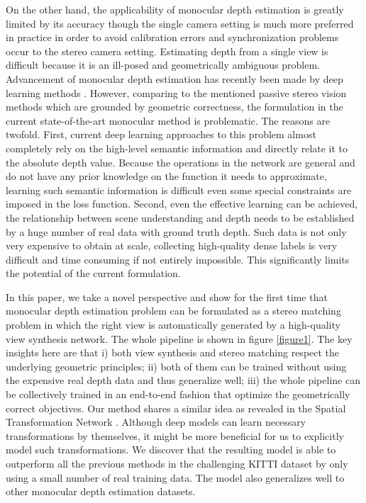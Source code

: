 \documentclass[10pt,twocolumn,letterpaper]{article}
\begin{document}
On the other hand, the applicability of monocular depth estimation is greatly limited by its accuracy though the single camera setting is much more preferred in practice in order to avoid calibration errors and synchronization problems occur to the stereo camera setting. Estimating depth from a single view is difficult because it is an ill-posed and geometrically ambiguous problem. Advancement of monocular depth estimation has recently been made by deep learning methods \cite{eigen2014depth,laina2016deeper,li2015depth,liu2015deep}
. However, comparing to the mentioned passive stereo vision methods which are grounded by geometric correctness, the formulation in the current state-of-the-art monocular method is problematic. The reasons are twofold. First, current deep learning approaches to this problem almost completely rely on the high-level semantic information and directly relate it to the absolute depth value. Because the operations in the network are general and do not have any prior knowledge on the function it needs to approximate, learning such semantic information is difficult even some special constraints are imposed in the loss function. Second, even the effective learning can be achieved, the relationship between scene understanding and depth needs to be established by a huge number of real data with ground truth depth. Such data is not only very expensive to obtain at scale, collecting high-quality dense labels is very difficult and time consuming if not entirely impossible. This significantly limits the potential of the current formulation.

In this paper, we take a novel perspective and show for the first time that monocular depth estimation problem can be formulated as a stereo matching problem in which the right view is automatically generated by a high-quality view synthesis network. The whole pipeline is shown in figure \ref{figure1}. The key insights here are that i) both view synthesis and stereo matching respect the underlying geometric principles; ii) both of them can be trained without using the expensive real depth data and thus generalize well; iii) the whole pipeline can be collectively trained in an end-to-end fashion that optimize the geometrically correct objectives. Our method shares a similar idea as revealed in the Spatial Transformation Network \cite{Jaderberg2015STN}. Although deep models can learn necessary transformations by themselves, it might be more beneficial for us to explicitly model such transformations. We discover that the resulting model is able to outperform all the previous methods in the challenging KITTI dataset \cite{Geiger2012CVPR} by only using a small number of real training data. The model also generalizes well to other monocular depth estimation datasets.
\end{document}
